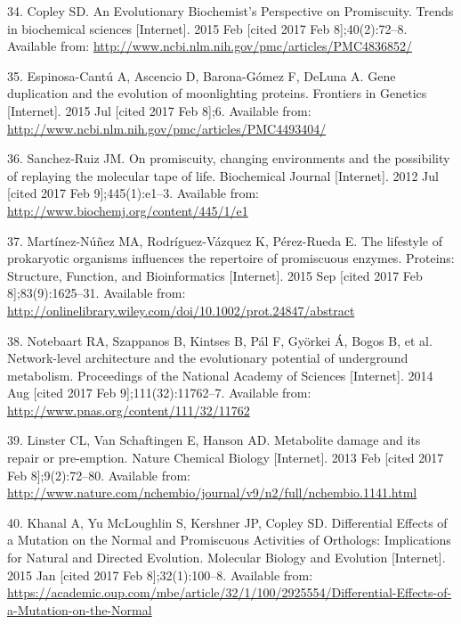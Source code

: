 \documentclass[12pt,twoside]{reedthesis}
\begin{document}
  \hypertarget{ref-copley_evolutionary_2015}{}
  34. Copley SD. An Evolutionary Biochemist's Perspective on Promiscuity.
  Trends in biochemical sciences {[}Internet{]}. 2015 Feb {[}cited 2017
  Feb 8{]};40(2):72--8. Available from:
  \url{http://www.ncbi.nlm.nih.gov/pmc/articles/PMC4836852/}
  
  \hypertarget{ref-espinosa-cantu_gene_2015}{}
  35. Espinosa-Cantú A, Ascencio D, Barona-Gómez F, DeLuna A. Gene
  duplication and the evolution of moonlighting proteins. Frontiers in
  Genetics {[}Internet{]}. 2015 Jul {[}cited 2017 Feb 8{]};6. Available
  from: \url{http://www.ncbi.nlm.nih.gov/pmc/articles/PMC4493404/}
  
  \hypertarget{ref-sanchez-ruiz_promiscuity_2012}{}
  36. Sanchez-Ruiz JM. On promiscuity, changing environments and the
  possibility of replaying the molecular tape of life. Biochemical Journal
  {[}Internet{]}. 2012 Jul {[}cited 2017 Feb 9{]};445(1):e1--3. Available
  from: \url{http://www.biochemj.org/content/445/1/e1}
  
  \hypertarget{ref-martinez-nunez_lifestyle_2015}{}
  37. Martínez-Núñez MA, Rodríguez-Vázquez K, Pérez-Rueda E. The lifestyle
  of prokaryotic organisms influences the repertoire of promiscuous
  enzymes. Proteins: Structure, Function, and Bioinformatics
  {[}Internet{]}. 2015 Sep {[}cited 2017 Feb 8{]};83(9):1625--31.
  Available from:
  \url{http://onlinelibrary.wiley.com/doi/10.1002/prot.24847/abstract}
  
  \hypertarget{ref-notebaart_network-level_2014}{}
  38. Notebaart RA, Szappanos B, Kintses B, Pál F, Györkei Á, Bogos B, et
  al. Network-level architecture and the evolutionary potential of
  underground metabolism. Proceedings of the National Academy of Sciences
  {[}Internet{]}. 2014 Aug {[}cited 2017 Feb 9{]};111(32):11762--7.
  Available from: \url{http://www.pnas.org/content/111/32/11762}
  
  \hypertarget{ref-linster_metabolite_2013}{}
  39. Linster CL, Van Schaftingen E, Hanson AD. Metabolite damage and its
  repair or pre-emption. Nature Chemical Biology {[}Internet{]}. 2013 Feb
  {[}cited 2017 Feb 8{]};9(2):72--80. Available from:
  \url{http://www.nature.com/nchembio/journal/v9/n2/full/nchembio.1141.html}
  
  \hypertarget{ref-khanal_differential_2015}{}
  40. Khanal A, Yu McLoughlin S, Kershner JP, Copley SD. Differential
  Effects of a Mutation on the Normal and Promiscuous Activities of
  Orthologs: Implications for Natural and Directed Evolution. Molecular
  Biology and Evolution {[}Internet{]}. 2015 Jan {[}cited 2017 Feb
  8{]};32(1):100--8. Available from:
  \url{https://academic.oup.com/mbe/article/32/1/100/2925554/Differential-Effects-of-a-Mutation-on-the-Normal}
  
\end{document}
